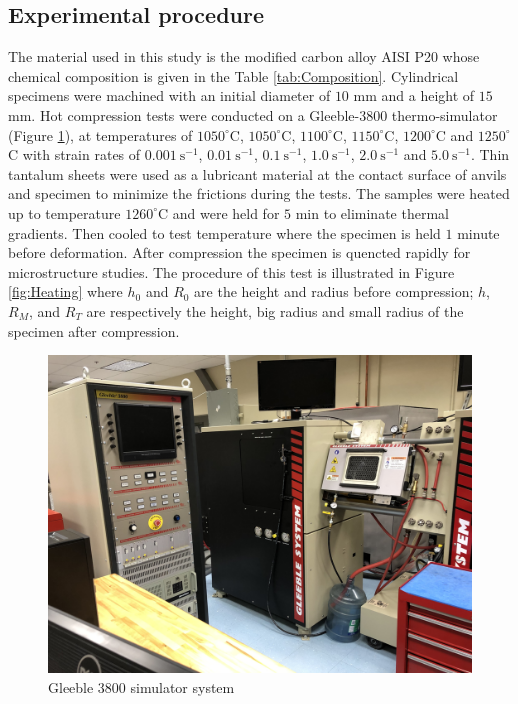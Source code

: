 \documentclass[twoside,english,1p,final,sort&compress]{elsarticle}
\theoremstyle{plain}
\begin{document}
\subsection{Experimental procedure}
The material used in this study is the modified carbon alloy AISI P20 whose chemical composition is given in the Table \ref{tab:Composition}. Cylindrical specimens were machined with an initial diameter of $10$ mm and a height of $15$ mm. Hot compression tests were conducted on a Gleeble-3800 thermo-simulator (Figure \ref{fig:Gleeble3800}), at temperatures of $1050^\circ$C,  $1050^\circ$C,  $1100^\circ$C,  $1150^\circ$C,  $1200^\circ$C and  $1250^\circ$C with strain rates of $0.001\ \text{s}^{-1}$, $0.01\ \text{s}^{-1}$, $0.1\ \text{s}^{-1}$, $1.0\ \text{s}^{-1}$, $2.0\ \text{s}^{-1}$ and $5.0\ \text{s}^{-1}$. Thin tantalum sheets were used as a lubricant material at the contact surface of anvils and specimen to minimize the frictions during the tests. The samples were heated up to temperature $1260^\circ$C  and were held for $5$ min to eliminate thermal gradients. Then cooled to test temperature where the specimen is held $1$ minute before deformation. After compression the specimen is quencted rapidly for microstructure studies. The procedure of this test is illustrated in Figure \ref{fig:Heating} where $h_0$ and $R_0$ are the height and radius before compression; $h$, $R_M$, and $R_T$ are respectively the height, big radius and small radius of the specimen after compression.
\begin{figure}[!ht]
\centering
\includegraphics[width=0.9\columnwidth]
{Figures/Gleeble-3800}
\caption{Gleeble 3800 simulator system}
\label{fig:Gleeble3800}
\end{figure}
\end{document}

